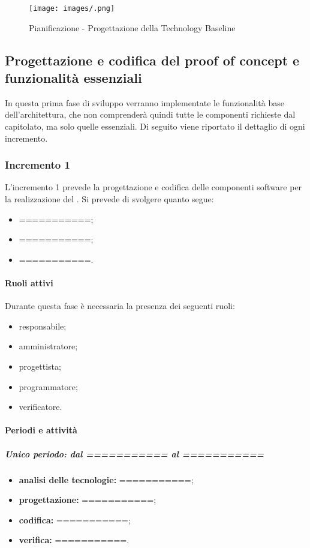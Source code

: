\newpage 

\begin{landscape} 
	\begin{figure}[h!] 
		\texttt{[image: images/.png]} 
		\caption{Pianificazione - Progettazione della Technology Baseline} 
	\end{figure} 
\end{landscape} 

\newpage %

\subsection{Progettazione e codifica del proof of concept e funzionalità essenziali}
In questa prima fase di sviluppo verranno implementate le funzionalità base dell'architettura, che non comprenderà quindi tutte le componenti richieste dal capitolato, ma solo quelle essenziali.
\newline
Di seguito viene riportato il dettaglio di ogni incremento.

\subsubsection{Incremento 1}
L'incremento 1 prevede la progettazione e codifica delle componenti software per la realizzazione del . Si prevede di svolgere quanto segue:
\begin{itemize}
	\item ===========;
	\item ===========;
	\item ===========.
\end{itemize}

\paragraph{Ruoli attivi}
Durante questa fase è necessaria la presenza dei seguenti ruoli: 
\begin{itemize} 
	\item responsabile; 
	\item amministratore; 
	\item progettista; 
	\item programmatore; 
	\item verificatore.
\end{itemize}

\paragraph{Periodi e attività}
\subparagraph{Unico periodo: dal =========== al ===========}
\begin{itemize}
	\item \textbf{analisi delle tecnologie:} ===========;
	\item \textbf{progettazione:} ===========;
	\item \textbf{codifica:} ===========;
	\item \textbf{verifica:} ===========.
\end{itemize}

